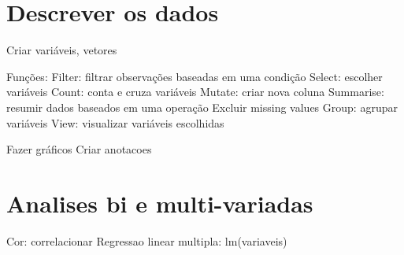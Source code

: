 \documentclass[
]{book}
\newenvironment{Shaded}{\begin{snugshade}}{\end{snugshade}}
\newcommand{\CommentTok}[1]{\textcolor[rgb]{0.56,0.35,0.01}{\textit{#1}}}
\newcommand{\DataTypeTok}[1]{\textcolor[rgb]{0.13,0.29,0.53}{#1}}
\newcommand{\KeywordTok}[1]{\textcolor[rgb]{0.13,0.29,0.53}{\textbf{#1}}}
\newcommand{\NormalTok}[1]{#1}
\newcommand{\OperatorTok}[1]{\textcolor[rgb]{0.81,0.36,0.00}{\textbf{#1}}}
\newcommand{\OtherTok}[1]{\textcolor[rgb]{0.56,0.35,0.01}{#1}}
\newcommand{\StringTok}[1]{\textcolor[rgb]{0.31,0.60,0.02}{#1}}
\begin{document}
\hypertarget{descrever-os-dados}{%
\section{Descrever os dados}\label{descrever-os-dados}}

Criar variáveis, vetores

Funções:
Filter: filtrar observações baseadas em uma condição
Select: escolher variáveis
Count: conta e cruza variáveis
Mutate: criar nova coluna
Summarise: resumir dados baseados em uma operação
Excluir missing values
Group: agrupar variáveis
View: visualizar variáveis escolhidas

Fazer gráficos
Criar anotacoes

\begin{Shaded}
\end{Shaded}

\hypertarget{analises-bi-e-multi-variadas}{%
\section{Analises bi e multi-variadas}\label{analises-bi-e-multi-variadas}}

Cor: correlacionar
Regressao linear multipla: lm(variaveis)
\end{document}
